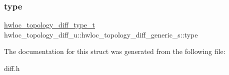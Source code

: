 \subsubsection{\texorpdfstring{type}{type}}
{\footnotesize\ttfamily \hyperlink{a00225_ga4b86adb00c8b2d09ebc4ef8f3bfd92b2}{hwloc\+\_\+topology\+\_\+diff\+\_\+type\+\_\+t} hwloc\+\_\+topology\+\_\+diff\+\_\+u\+::hwloc\+\_\+topology\+\_\+diff\+\_\+generic\+\_\+s\+::type}



The documentation for this struct was generated from the following file\+:\begin{DoxyCompactItemize}
\item 
diff.\+h\end{DoxyCompactItemize}

